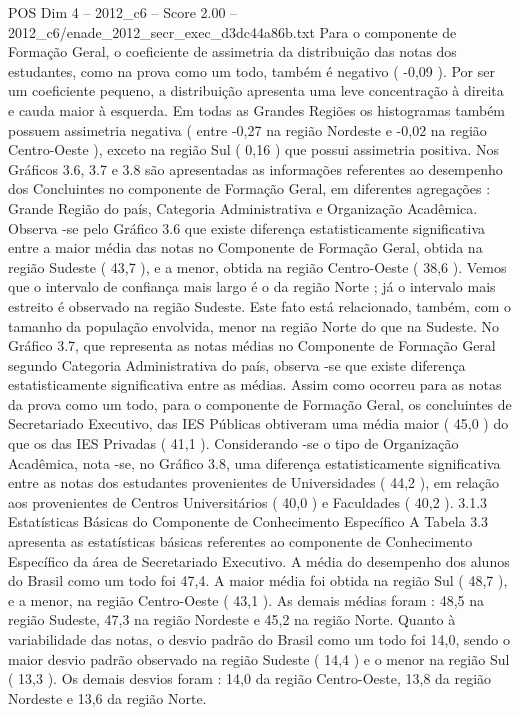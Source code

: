 \begin{textsample}{POS Dim 4 – 2012\_c6 – Score 2.00 – 2012\_c6/enade\_2012\_secr\_exec\_d3dc44a86b.txt}
Para o componente de Formação Geral, o coeficiente de assimetria da distribuição das notas dos estudantes, como na prova como um todo, também é negativo ( -0,09 ).
Por ser um coeficiente pequeno, a distribuição apresenta uma leve concentração à direita e cauda maior à esquerda.
Em todas as Grandes Regiões os histogramas também possuem assimetria negativa ( entre -0,27 na região Nordeste e -0,02 na região Centro-Oeste ), exceto na região Sul ( 0,16 ) que possui assimetria positiva.
Nos Gráficos 3.6, 3.7 e 3.8 são apresentadas as informações referentes ao desempenho dos Concluintes no componente de Formação Geral, em diferentes agregações : Grande Região do país, Categoria Administrativa e Organização Acadêmica.
Observa -se pelo Gráfico 3.6 que existe diferença estatisticamente significativa entre a maior média das notas no Componente de Formação Geral, obtida na região Sudeste ( 43,7 ), e a menor, obtida na região Centro-Oeste ( 38,6 ).
Vemos que o intervalo de confiança mais largo é o da região Norte ; já o intervalo mais estreito é observado na região Sudeste.
Este fato está relacionado, também, com o tamanho da população envolvida, menor na região Norte do que na Sudeste.
No Gráfico 3.7, que representa as notas médias no Componente de Formação Geral segundo Categoria Administrativa do país, observa -se que existe diferença estatisticamente significativa entre as médias.
Assim como ocorreu para as notas da prova como um todo, para o componente de Formação Geral, os concluintes de Secretariado Executivo, das IES Públicas obtiveram uma média maior ( 45,0 ) do que os das IES Privadas ( 41,1 ).
Considerando -se o tipo de Organização Acadêmica, nota -se, no Gráfico 3.8, uma diferença estatisticamente significativa entre as notas dos estudantes provenientes de Universidades ( 44,2 ), em relação aos provenientes de Centros Universitários ( 40,0 ) e Faculdades ( 40,2 ). 3.1.3 Estatísticas Básicas do Componente de Conhecimento Específico A Tabela 3.3 apresenta as estatísticas básicas referentes ao componente de Conhecimento Específico da área de Secretariado Executivo.
A média do desempenho dos alunos do Brasil como um todo foi 47,4.
A maior média foi obtida na região Sul ( 48,7 ), e a menor, na região Centro-Oeste ( 43,1 ).
As demais médias foram : 48,5 na região Sudeste, 47,3 na região Nordeste e 45,2 na região Norte.
Quanto à variabilidade das notas, o desvio padrão do Brasil como um todo foi 14,0, sendo o maior desvio padrão observado na região Sudeste ( 14,4 ) e o menor na região Sul ( 13,3 ).
Os demais desvios foram : 14,0 da região Centro-Oeste, 13,8 da região Nordeste e 13,6 da região Norte.

\end{textsample}
